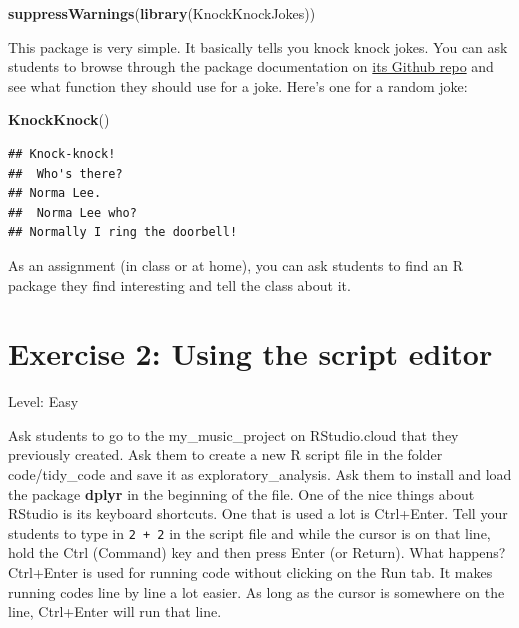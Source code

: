 \documentclass[]{book}
\newenvironment{Shaded}{\begin{snugshade}}{\end{snugshade}}
\newcommand{\KeywordTok}[1]{\textcolor[rgb]{0.13,0.29,0.53}{\textbf{#1}}}
\newcommand{\NormalTok}[1]{#1}
\begin{document}
\begin{Shaded}
\begin{Highlighting}[]
\KeywordTok{suppressWarnings}\NormalTok{(}\KeywordTok{library}\NormalTok{(KnockKnockJokes))}
\end{Highlighting}
\end{Shaded}

This package is very simple. It basically tells you knock knock jokes. You can ask students to browse through the package documentation on \href{https://github.com/psolymos/KnockKnockJokes}{its Github repo} and see what function they should use for a joke. Here's one for a random joke:

\begin{Shaded}
\begin{Highlighting}[]
\KeywordTok{KnockKnock}\NormalTok{()}
\end{Highlighting}
\end{Shaded}

\begin{verbatim}
## Knock-knock!
##  Who's there?
## Norma Lee.
##  Norma Lee who?
## Normally I ring the doorbell!
\end{verbatim}

As an assignment (in class or at home), you can ask students to find an R package they find interesting and tell the class about it.

\hypertarget{exercise-2-using-the-script-editor}{%
\section*{Exercise 2: Using the script editor}\label{exercise-2-using-the-script-editor}}

Level: Easy

Ask students to go to the my\_music\_project on RStudio.cloud that they previously created. Ask them to create a new R script file in the folder code/tidy\_code and save it as exploratory\_analysis. Ask them to install and load the package \textbf{dplyr} in the beginning of the file. One of the nice things about RStudio is its keyboard shortcuts. One that is used a lot is Ctrl+Enter. Tell your students to type in \texttt{2\ +\ 2} in the script file and while the cursor is on that line, hold the Ctrl (Command) key and then press Enter (or Return). What happens? Ctrl+Enter is used for running code without clicking on the Run tab. It makes running codes line by line a lot easier. As long as the cursor is somewhere on the line, Ctrl+Enter will run that line.
\end{document}
